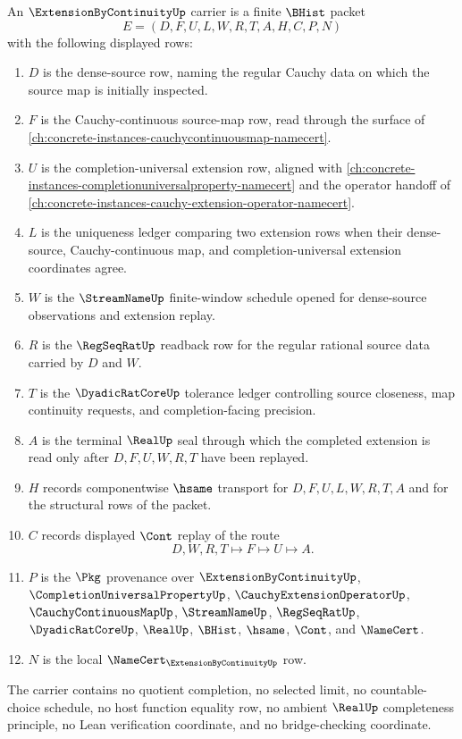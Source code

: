 \begin{definition}
\label{def:extension-by-continuity-carrier}
An $\ExtensionByContinuityUp$ carrier is a finite $\BHist$ packet
$$
E=(D,F,U,L,W,R,T,A,H,C,P,N)
$$
with the following displayed rows:
\begin{enumerate}
\item $D$ is the dense-source row, naming the regular Cauchy data on which the source map is initially inspected.
\item $F$ is the Cauchy-continuous source-map row, read through the surface of \autoref{ch:concrete-instances-cauchycontinuousmap-namecert}.
\item $U$ is the completion-universal extension row, aligned with \autoref{ch:concrete-instances-completionuniversalproperty-namecert} and the operator handoff of \autoref{ch:concrete-instances-cauchy-extension-operator-namecert}.
\item $L$ is the uniqueness ledger comparing two extension rows when their dense-source, Cauchy-continuous map, and completion-universal extension coordinates agree.
\item $W$ is the $\StreamNameUp$ finite-window schedule opened for dense-source observations and extension replay.
\item $R$ is the $\RegSeqRatUp$ readback row for the regular rational source data carried by $D$ and $W$.
\item $T$ is the $\DyadicRatCoreUp$ tolerance ledger controlling source closeness, map continuity requests, and completion-facing precision.
\item $A$ is the terminal $\RealUp$ seal through which the completed extension is read only after $D,F,U,W,R,T$ have been replayed.
\item $H$ records componentwise $\hsame$ transport for $D,F,U,L,W,R,T,A$ and for the structural rows of the packet.
\item $C$ records displayed $\Cont$ replay of the route
$$
D,W,R,T\longmapsto F\longmapsto U\longmapsto A .
$$
\item $P$ is the $\Pkg$ provenance over $\ExtensionByContinuityUp$, $\CompletionUniversalPropertyUp$, $\CauchyExtensionOperatorUp$, $\CauchyContinuousMapUp$, $\StreamNameUp$, $\RegSeqRatUp$, $\DyadicRatCoreUp$, $\RealUp$, $\BHist$, $\hsame$, $\Cont$, and $\NameCert$.
\item $N$ is the local $\NameCert_{\ExtensionByContinuityUp}$ row.
\end{enumerate}
The carrier contains no quotient completion, no selected limit, no countable-choice schedule, no host function equality row, no ambient $\RealUp$ completeness principle, no Lean verification coordinate, and no bridge-checking coordinate.
\end{definition}

